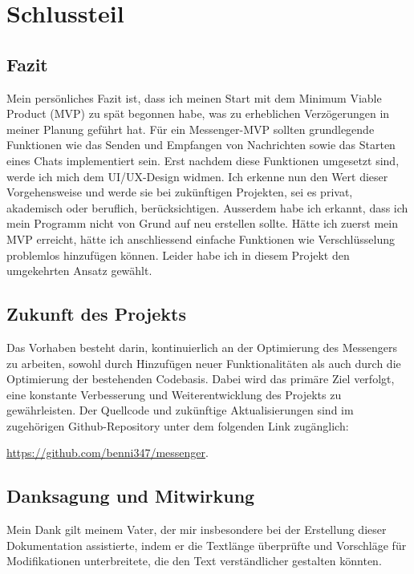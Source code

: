 \section{Schlussteil}
\subsection{Fazit}
Mein persönliches Fazit ist, dass ich meinen Start mit dem Minimum Viable Product (MVP) zu spät begonnen habe, was zu erheblichen Verzögerungen in meiner Planung geführt hat. Für ein Messenger-MVP sollten grundlegende Funktionen wie das Senden und Empfangen von Nachrichten sowie das Starten eines Chats implementiert sein. Erst nachdem diese Funktionen umgesetzt sind, werde ich mich dem UI/UX-Design widmen. Ich erkenne nun den Wert dieser Vorgehensweise und werde sie bei zukünftigen Projekten, sei es privat, akademisch oder beruflich, berücksichtigen. Ausserdem habe ich erkannt, dass ich mein Programm nicht von Grund auf neu erstellen sollte. Hätte ich zuerst mein MVP erreicht, hätte ich anschliessend einfache Funktionen wie Verschlüsselung problemlos hinzufügen können. Leider habe ich in diesem Projekt den umgekehrten Ansatz gewählt.
\subsection{Zukunft des Projekts}
Das Vorhaben besteht darin, kontinuierlich an der Optimierung des Messengers zu arbeiten, sowohl durch Hinzufügen neuer Funktionalitäten als auch durch die Optimierung der bestehenden Codebasis. Dabei wird das primäre Ziel verfolgt, eine konstante Verbesserung und Weiterentwicklung des Projekts zu gewährleisten. Der Quellcode und zukünftige Aktualisierungen sind im zugehörigen Github-Repository unter dem folgenden Link zugänglich:

\href{https://github.com/benni347/messenger}{https://github.com/benni347/messenger}.
\subsection{Danksagung und Mitwirkung}
Mein Dank gilt meinem Vater, der mir insbesondere bei der Erstellung dieser Dokumentation assistierte, indem er die Textlänge überprüfte und Vorschläge für Modifikationen unterbreitete, die den Text verständlicher gestalten könnten.